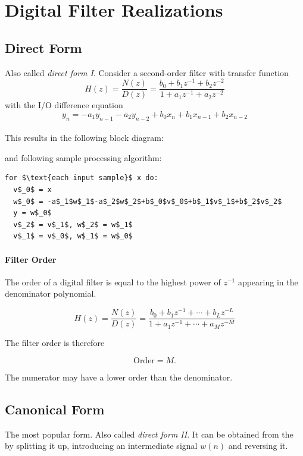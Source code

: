 \section{Digital Filter Realizations}

\subsection{Direct Form}
\label{sec:directform}
Also called \emph{direct form I}. Consider a second-order filter with
transfer function
\begin{equation*}
	H(z) = \frac{N(z)}{D(z)}
		 = \frac{b_0 + b_1z^{-1} + b_2z^{-2}}{1 + a_1z^{-1} + a_2z^{-2}}
\end{equation*}
with the I/O difference equation
\begin{equation*}
	y_n = -a_1 y_{n-1} - a_2 y_{n-2} + b_0 x_n + b_1 x_{n-1} + b_2 x_{n-2}
\end{equation*}\\

This results in the following block diagram: \\

\begin{center}
	
\end{center}

and following sample processing algorithm:
\begin{lstlisting}[mathescape]
for $\text{each input sample}$ x do:
  v$_0$ = x
  w$_0$ = -a$_1$w$_1$-a$_2$w$_2$+b$_0$v$_0$+b$_1$v$_1$+b$_2$v$_2$
  y = w$_0$
  v$_2$ = v$_1$, w$_2$ = w$_1$
  v$_1$ = v$_0$, w$_1$ = w$_0$
\end{lstlisting}

\paragraph{Filter Order}

The order of a digital filter is equal to the highest power of $z^{-1}$
appearing in the denominator polynomial.

\[
H(z)=\frac{N(z)}{D(z)}
=\frac{b_0+b_1z^{-1}+\cdots+b_Lz^{-L}}
{1+a_1z^{-1}+\cdots+a_Mz^{-M}}
\]

The filter order is therefore

\[
\boxed{\text{Order}=M.}
\]

The numerator may have a lower order than the denominator.

\subsection{Canonical Form}
\label{sec:canonicalform}
The most popular form. Also called \emph{direct form II}. It can be obtained from
the  by splitting it up, introducing an intermediate signal $w(n)$ and reversing it.


